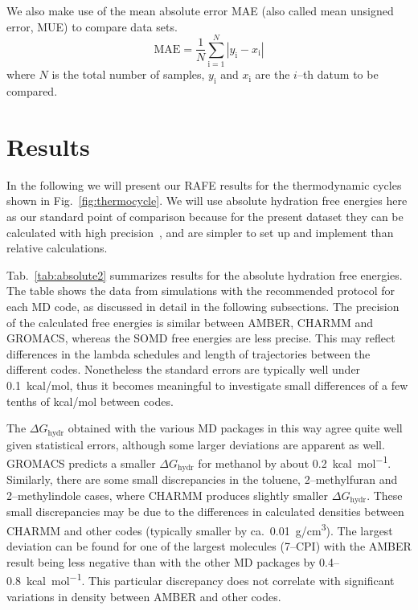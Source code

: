 \documentclass[journal=jctcce,manuscript=article]{achemso}
\begin{document}
We also make use of the mean absolute error MAE (also called mean unsigned
error, MUE) to compare data sets.
\begin{equation}
\label{eq:MUE}
\mathrm{MAE} = \frac{1}{N}\sum_\mathrm{i=1}^N \left | y_\mathrm{i} -
x_\mathrm{i} \right |
\end{equation}
where $N$ is the total number of samples, $y_\mathrm{i}$ and $x_\mathrm{i}$ are
the $i$--th datum to be compared.


\section{Results}
\label{sec:results}

In the following we will present our RAFE results for the
thermodynamic cycles shown in Fig.~\ref{fig:thermocycle}.  We will use
absolute hydration free energies here as our standard point of
comparison because for the present dataset they can be calculated with
high precision~\cite{doi:10.1021/acs.jced.7b00104}, and are simpler to
set up and implement than relative calculations.  

Tab.~\ref{tab:absolute2} summarizes results for the absolute hydration
free energies.  The table shows the data
from simulations with the recommended protocol for each MD code, as
discussed in detail in the following subsections.
The  precision of the calculated free energies is similar between
AMBER, CHARMM and GROMACS, whereas the SOMD free energies are less
precise.  This may reflect differences in the lambda schedules and
length of trajectories between the different codes.  Nonetheless the
standard errors are typically well under \SI{0.1}{kcal/mol}, thus it
becomes meaningful to investigate small differences of a few tenths of
\si{kcal/mol} between codes.

The $\Delta G_{\mathrm{hydr}}$
obtained with the various MD packages in
this way agree quite well given statistical errors, although some larger deviations are apparent as
well.  GROMACS predicts a smaller $\Delta G_{\mathrm{hydr}}$ for
methanol by about \SI{+0.2}{kcal.mol^{-1}}.  Similarly, there are some
small discrepancies in the toluene, 2--methylfuran and 2--methylindole
cases, where CHARMM produces slightly smaller $\Delta
G_{\mathrm{hydr}}$.  These small discrepancies may be due to the
differences in calculated densities between CHARMM and other codes
(typically smaller by ca.\ \SI{0.01}{g/cm^3}).
The largest deviation can be found for one of the largest
molecules (7--CPI) with the AMBER result being less negative than with
the other MD packages by 0.4--\SI{0.8}{kcal.mol^{-1}}.  This
particular discrepancy does not correlate with significant variations
in density between AMBER and other codes.
\end{document}
